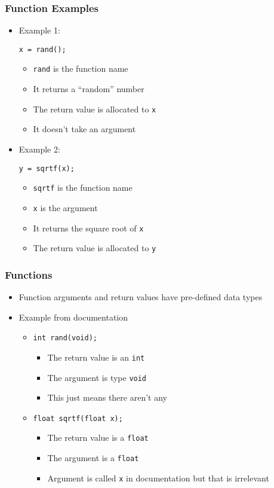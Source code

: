 \documentclass[14pt]{beamer}
\begin{document}
\begin{frame}[fragile]
\frametitle{Function Examples}
\begin{itemize}
\item Example 1:
\begin{lstlisting}[style=CStyle]
x = rand();
\end{lstlisting}
	\begin{itemize}
		\item \texttt{rand} is the function name
		\item It returns a ``random'' number
		\item The return value is allocated to \texttt{x}
		\item It doesn't take an argument 	
	\end{itemize}
\pause
\item Example 2:
\begin{lstlisting}[style=CStyle]
y = sqrtf(x);
\end{lstlisting}
	\begin{itemize}
		\item \texttt{sqrtf} is the function name
		\item \texttt{x} is the argument
		\item It returns the square root of \texttt{x}
		\item The return value is allocated to \texttt{y}
	\end{itemize}
\end{itemize}
\end{frame}

\begin{frame}
\frametitle{Functions}
\begin{itemize}
\item Function arguments and return values have pre-defined data types
\pause
\item Example from documentation
\begin{itemize}
\item \texttt{int~rand(void);}
	\begin{itemize}
		\item The return value is an \texttt{int}
		\item The argument is type \texttt{void}
		\item This just means there aren't any
	\end{itemize}
\pause
\item \texttt{float sqrtf(float x);}
	\begin{itemize}
		\item The return value is a \texttt{float}
		\item The argument is a \texttt{float}
		\item Argument is called \texttt{x} in documentation but that is irrelevant
	\end{itemize}
\end{itemize}
\end{itemize}
\end{frame}
\end{document}

